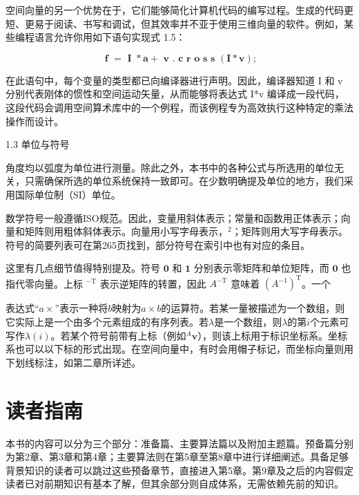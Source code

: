 \documentclass[10pt,a4paper]{book}
\theoremstyle{thmstyle} %
\theoremstyle{defstyle} %
\theoremstyle{prostyle} %
\begin{document}
空间向量的另一个优势在于，它们能够简化计算机代码的编写过程。生成的代码更短、更易于阅读、书写和调试，但其效率并不亚于使用三维向量的软件。例如，某些编程语言允许你用如下语句实现式 1.5：



$$
\textbf { f } = \textbf { I } * \mathbf { a } + \textbf { v . c r o s s } ( \mathbf { I } * \mathbf { v } ) ;
$$



在此语句中，每个变量的类型都已向编译器进行声明。因此，编译器知道 I 和 v 分别代表刚体的惯性和空间运动矢量，从而能够将表达式 I*v 编译成一段代码，这段代码会调用空间算术库中的一个例程，而该例程专为高效执行这种特定的乘法操作而设计。



1.3 单位与符号



角度均以弧度为单位进行测量。除此之外，本书中的各种公式与所选用的单位无关，只需确保所选的单位系统保持一致即可。在少数明确提及单位的地方，我们采用国际单位制（SI）单位。



数学符号一般遵循ISO规范。因此，变量用斜体表示；常量和函数用正体表示；向量和矩阵则用粗体斜体表示。向量用小写字母表示，$^{2}$；矩阵则用大写字母表示。符号的简要列表可在第265页找到，部分符号在索引中也有对应的条目。



这里有几点细节值得特别提及。符号 $\mathbf{0}$ 和 $\mathbf{1}$ 分别表示零矩阵和单位矩阵，而 $\mathbf{0}$ 也指代零向量。上标 $^{-\mathrm{T}}$ 表示逆矩阵的转置，因此 $A^{-\mathrm{T}}$ 意味着 $(A^{-1})^{\mathrm{T}}$。一个



表达式“$a \times$”表示一种将$b$映射为$a \times b$的运算符。若某一量被描述为一个数组，则它实际上是一个由多个元素组成的有序列表。若$\lambda$是一个数组，则$\lambda$的第$i$个元素可写作$\lambda(i)$。若某个符号前带有上标（例如${}^{A} \boldsymbol{v}$），则该上标用于标识坐标系。坐标系也可以以下标的形式出现。在空间向量中，有时会用帽子标记，而坐标向量则用下划线标注，如第二章所详述。



\section{读者指南}





本书的内容可以分为三个部分：准备篇、主要算法篇以及附加主题篇。预备篇分别为第2章、第3章和第4章；主要算法则在第5章至第8章中进行详细阐述。具备足够背景知识的读者可以跳过这些预备章节，直接进入第5章。第9章及之后的内容假定读者已对前期知识有基本了解，但其余部分则自成体系，无需依赖先前的知识。
\end{document}
